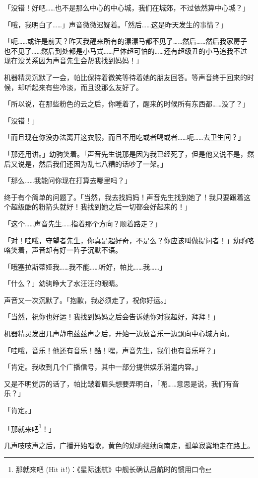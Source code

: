 「没错！好吧……也不是那么中心的中心城，我们在城郊，不过依然算中心城？」

「哦，我明白了……」声音微微迟疑着。「然后……这是昨天发生的事情？」

「呃……或许是前天？昨天我醒来所有的漂漂马都不见了……然后……然后我家房子也不见了……然后到处都是小马式……尸体超可怕的……还有超级丑的小马追我不过现在没关系因为声音先生会帮我找到妈妈！」

机器精灵沉默了一会，帕比保持着微笑等待着她的朋友回答。等声音终于回来的时候，却听起来有些冷淡，而且没那么友好了。

「所以说，在那些粉色的云之后，你睡着了，醒来的时候所有东西都……没了？」

「没错！」

「而且现在你没办法离开这衣服，而且不用吃或者喝或者……呃……去卫生间？」

「那还用讲。」幼驹笑着。「声音先生说那是因为我已经死了，但是他又说不是，然后又说是，然后我们还因为乱七八糟的话吵了一架。」

「那么……我能问你现在打算去哪里吗？」

终于有个简单的问题了。「当然，我去找妈妈！声音先生找到她了！我只要跟着这个超级酷的粉箭头就好！我找到她之后一切都会好起来的！」

「这个……声音先生……指着那个方向？顺着路走？」

「对！哇哦，守望者先生，你真是超好奇，不是么？你应该叫做提问者！」幼驹咯咯笑着，声音却有好一阵子沉默不语。

「哦塞拉斯蒂娅我……我不能……听好，帕比……我……」

「什么？」幼驹睁大了水汪汪的眼睛。

声音又一次沉默了。「抱歉，我必须走了，祝你好运。」

「当然，祝你也好运！我找到妈妈之后会告诉她你对我超好，拜拜！」

机器精灵发出几声静电兹兹声之后，开始一边放音乐一边飘向中心城方向。

「哇哦，音乐！他还有音乐！酷！嘿，声音先生，我们也有音乐咩？」

「{\mt 肯定。我收到几个广播信号，其中一部分提供娱乐消遣内容。}」

又是不明觉厉的话了，帕比皱着眉头想要弄明白，「呃……意思是说，我们有音乐？」

「{\mt 肯定。}」

「那就来吧\footnote{那就来吧 (Hit it!)：《星际迷航》中舰长确认启航时的惯用口令}！」


几声吱吱声之后，广播开始唱歌，黄色的幼驹继续向南走，孤单寂寞地走在路上。

